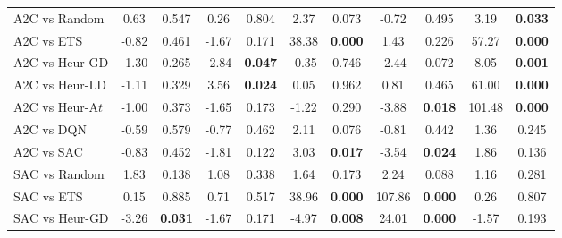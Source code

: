\begin{tabular}{lcccccccccc}
	\midrule 
	A2C vs Random    & 0.63          & 0.547                  & 0.26          & 0.804                  & 2.37           & 0.073                 & -0.72          & 0.495                 & 3.19           & \textbf{0.033}        \\
	A2C vs ETS       & -0.82         & 0.461                  & -1.67         & 0.171                  & 38.38          & \textbf{0.000}        & 1.43           & 0.226                 & 57.27          & \textbf{0.000}        \\
	A2C vs Heur-GD   & -1.30         & 0.265                  & -2.84         & \textbf{0.047}         & -0.35          & 0.746                 & -2.44          & 0.072                 & 8.05           & \textbf{0.001}        \\
	A2C vs Heur-LD   & -1.11         & 0.329                  & 3.56          & \textbf{0.024}         & 0.05           & 0.962                 & 0.81           & 0.465                 & 61.00          & \textbf{0.000}        \\
	A2C vs Heur-A$t$  & -1.00         & 0.373                  & -1.65         & 0.173                  & -1.22          & 0.290                 & -3.88          & \textbf{0.018}        & 101.48         & \textbf{0.000}        \\
	A2C vs DQN       & -0.59         & 0.579                  & -0.77         & 0.462                  & 2.11           & 0.076                 & -0.81          & 0.442                 & 1.36           & 0.245                 \\
	A2C vs SAC       & -0.83         & 0.452                  & -1.81         & 0.122                  & 3.03           & \textbf{0.017}        & -3.54          & \textbf{0.024}        & 1.86           & 0.136                 \\
	\midrule 
	SAC vs Random    & 1.83          & 0.138                  & 1.08          & 0.338                  & 1.64           & 0.173                 & 2.24           & 0.088                 & 1.16           & 0.281                 \\
	SAC vs ETS       & 0.15          & 0.885                  & 0.71          & 0.517                  & 38.96          & \textbf{0.000}        & 107.86         & \textbf{0.000}        & 0.26           & 0.807                 \\
	SAC vs Heur-GD   & -3.26         & \textbf{0.031}         & -1.67         & 0.171                  & -4.97          & \textbf{0.008}        & 24.01          & \textbf{0.000}        & -1.57          & 0.193                 \\

\end{tabular}
